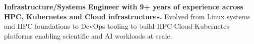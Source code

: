 
\begin{cventries}
\cventry
{} %
{} %
{} %
{} %
{ %
	\begin{cvitems}
        \item{\textbf{Infrastructure/Systems Engineer with 9+ years of experience across HPC, Kubernetes and Cloud infrastructures.} Evolved from Linux systems and HPC foundations to DevOps tooling to build HPC-Cloud-Kubernetes platforms enabling scientific and AI workloads at scale.}
	\end{cvitems}
}
\end{cventries}


